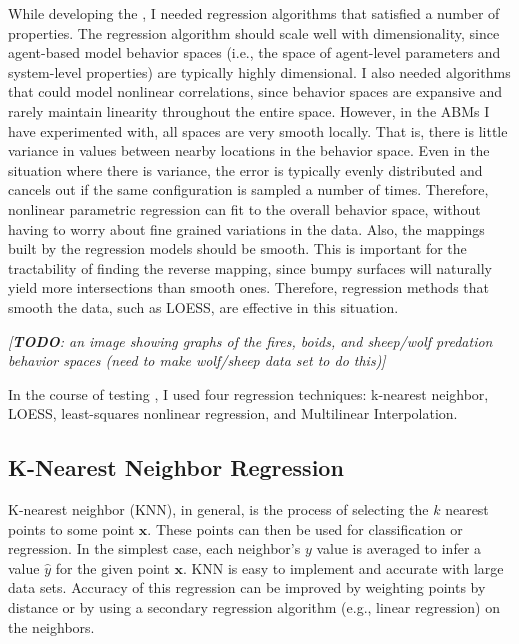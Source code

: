 While developing the \framework, I needed regression algorithms that satisfied a number of properties.
The regression algorithm should scale well with dimensionality, since agent-based model behavior spaces (i.e., the space of agent-level parameters and system-level properties) are typically highly dimensional.
I also needed algorithms that could model nonlinear correlations, since behavior spaces are expansive and rarely maintain linearity throughout the entire space.
However, in the ABMs I have experimented with, all spaces are very smooth locally.
That is, there is little variance in values between nearby locations in the behavior space.
Even in the situation where there is variance, the error is typically evenly distributed and cancels out if the same configuration is sampled a number of times.
Therefore, nonlinear parametric regression can fit to the overall behavior space, without having to worry about fine grained variations in the data.
Also, the mappings built by the regression models should be smooth.
This is important for the tractability of finding the reverse mapping, since bumpy surfaces will naturally yield more intersections than smooth ones.
Therefore, regression methods that smooth the data, such as LOESS, are effective in this situation.

\textit{[\textbf{TODO}: an image showing graphs of the fires, boids, and sheep/wolf predation behavior spaces (need to make wolf/sheep data set to do this)]}

In the course of testing \fw, I used four regression techniques: k-nearest neighbor, LOESS, least-squares nonlinear regression, and Multilinear Interpolation.

\subsection{K-Nearest Neighbor Regression}
K-nearest neighbor (KNN), in general, is the process of selecting the $k$ nearest points to some point $\mathbf x$.
These points can then be used for classification or regression.
In the simplest case, each neighbor's $y$ value is averaged to infer a value $\hat y$ for the given point $\mathbf x$.
KNN is easy to implement and accurate with large data sets.
Accuracy of this regression can be improved by weighting points by distance or by using a secondary regression algorithm (e.g., linear regression) on the neighbors.

